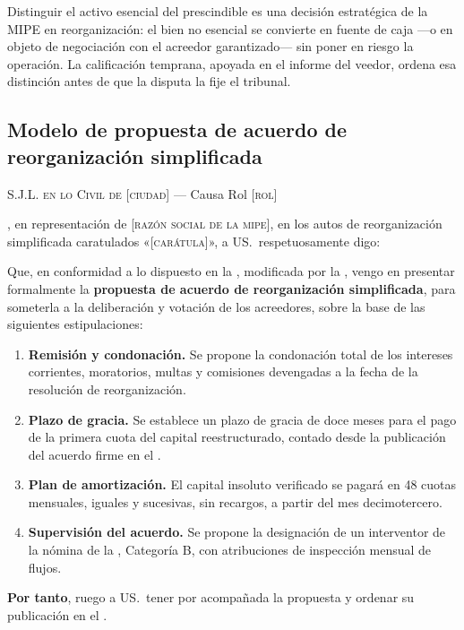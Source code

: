 \begin{foco}
Distinguir el activo esencial del prescindible es una decisión estratégica de la MIPE en
reorganización: el bien no esencial se convierte en fuente de caja ---o en objeto de negociación
con el acreedor garantizado--- sin poner en riesgo la operación. La calificación temprana,
apoyada en el informe del veedor, ordena esa distinción antes de que la disputa la fije el
tribunal.
\end{foco}

\bloquePractico

\subsection{Modelo de propuesta de acuerdo de reorganización simplificada}

\begin{escrito}
\small
\noindent\textsc{S.J.L. en lo Civil de} [\textsc{ciudad}] --- Causa Rol [\textsc{rol}]

\medskip
{}, en representación de
[\textsc{razón social de la mipe}], en los autos de reorganización simplificada
caratulados «[\textsc{carátula}]», a US.\ respetuosamente digo:

\medskip
Que, en conformidad a lo dispuesto en la \LIR{}, modificada por la \Lreforma{}, vengo en
presentar formalmente la \textbf{propuesta de acuerdo de reorganización simplificada},
para someterla a la deliberación y votación de los acreedores, sobre la base de las
siguientes estipulaciones:

\begin{enumerate}[leftmargin=1.6em]
  \item \textbf{Remisión y condonación.} Se propone la condonación total de los intereses
  corrientes, moratorios, multas y comisiones devengadas a la fecha de la resolución de
  reorganización.

  \item \textbf{Plazo de gracia.} Se establece un plazo de gracia de doce meses para el
  pago de la primera cuota del capital reestructurado, contado desde la publicación del
  acuerdo firme en el \boletin{}.

  \item \textbf{Plan de amortización.} El capital insoluto verificado se pagará en 48
  cuotas mensuales, iguales y sucesivas, sin recargos, a partir del mes decimotercero.

  \item \textbf{Supervisión del acuerdo.} Se propone la designación de un interventor de
  la nómina de la \superir{}, Categoría B, con atribuciones de inspección mensual de
  flujos.
\end{enumerate}

\medskip
\noindent\textbf{Por tanto}, ruego a US.\ tener por acompañada la propuesta y ordenar su
publicación en el \boletin{}.
\end{escrito}

